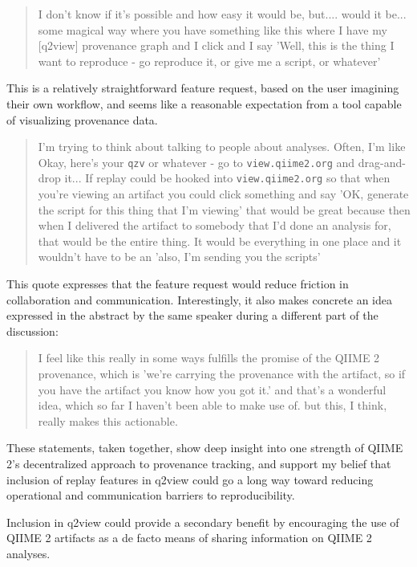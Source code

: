 \begin{quote}
I don't know if it's possible and how easy it would be, but.... would it be...
some magical way where you have something like this where I have my [q2view]
provenance graph and I click and I say 'Well, this is the thing I want to
reproduce - go reproduce it, or give me a script, or whatever'
\end{quote}

\noindent This is a relatively straightforward feature request, based on the user
imagining their own workflow, and seems like a reasonable expectation from a
tool capable of visualizing provenance data.

\begin{quote}
I'm trying to think about talking to people about analyses. Often, I'm like
Okay, here's your \texttt{qzv} or whatever - go to \texttt{view.qiime2.org} and drag-and-drop
it... If replay could be hooked into \texttt{view.qiime2.org} so that when you're viewing
an artifact you could click something and say 'OK, generate the script for this
thing that I'm viewing' that would be great because then when I delivered the
artifact to somebody that I'd done an analysis for, that would be the entire
thing. It would be everything in one place and it wouldn't have to be an 'also,
I'm sending you the scripts'
\end{quote}

\noindent This quote expresses that the feature request would reduce friction in
collaboration and communication. Interestingly, it also makes concrete an idea
expressed in the abstract by the same speaker during a different part of the
discussion:

\begin{quote}
I feel like this really in some ways fulfills the promise of the QIIME 2
provenance, which is 'we're carrying the provenance with the artifact, so if you
have the artifact you know how you got it.' and that's a wonderful idea, which
so far I haven't been able to make use of. but this, I think, really makes this
actionable.
\end{quote}

\noindent These statements, taken together, show deep insight into one strength of QIIME
2’s decentralized approach to provenance tracking, and support my belief that
inclusion of replay features in q2view could go a long way toward reducing
operational and communication barriers to reproducibility. 

Inclusion in q2view could provide a secondary benefit by encouraging the use of
QIIME 2 artifacts as a de facto means of sharing information on QIIME 2 analyses.

